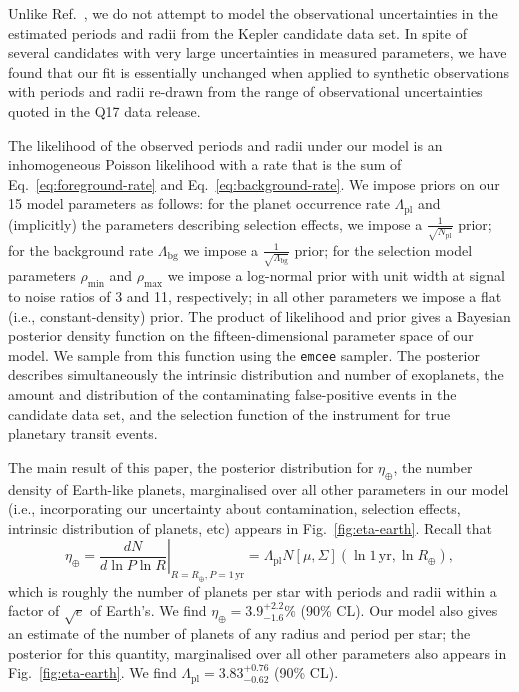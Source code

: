 \documentclass[12pt]{article}
\newcommand{\etaearth}{\eta_\oplus}
\newcommand{\REarth}{R_\oplus}
\newcommand{\Rpl}{\Lambda_\mathrm{pl}}
\newcommand{\Npl}{N_\mathrm{pl}}
\newcommand{\Rbg}{\Lambda_\mathrm{bg}}
\newcommand{\rhomin}{\rho_\mathrm{min}}
\newcommand{\rhomax}{\rho_\mathrm{max}}
\newcommand{\earange}{3.9_{-1.6}^{+2.2}\%}
\newcommand{\rplrange}{3.83_{-0.62}^{+0.76}}
\begin{document}
Unlike Ref.\ \cite{Foreman-Mackey2014}, we do not attempt to model the
observational uncertainties in the estimated periods and radii from
the Kepler candidate data set.  In spite of several candidates with
very large uncertainties in measured parameters, we have found that our
fit is essentially unchanged when applied to synthetic observations
with periods and radii re-drawn from the range of observational
uncertainties quoted in the Q17 data release.  

The likelihood of the observed periods and radii under our model is an
inhomogeneous Poisson likelihood\cite{Farr2013,Youdin2011} with a rate
that is the sum of Eq.\ \eqref{eq:foreground-rate} and
Eq.\ \eqref{eq:background-rate}.  We impose priors on our 15 model
parameters as follows: for the planet occurrence rate $\Rpl$ and
(implicitly) the parameters describing selection effects, we impose a
$\frac{1}{\sqrt{\Npl}}$ prior; for the background rate $\Rbg$ we
impose a $\frac{1}{\sqrt{\Rbg}}$ prior; for the selection model
parameters $\rhomin$ and $\rhomax$ we impose a log-normal prior with
unit width at signal to noise ratios of 3 and 11, respectively; in all
other parameters we impose a flat (i.e., constant-density) prior.  The
product of likelihood and prior gives a Bayesian posterior density
function on the fifteen-dimensional parameter space of our model.  We
sample from this function using the \texttt{emcee}
sampler\cite{Foreman-Mackey2013}.  The posterior describes
simultaneously the intrinsic distribution and number of exoplanets,
the amount and distribution of the contaminating false-positive events
in the candidate data set, and the selection function of the
instrument for true planetary transit events.

The main result of this paper, the posterior distribution for
$\etaearth$, the number density of Earth-like planets, marginalised
over all other parameters in our model (i.e., incorporating our
uncertainty about contamination, selection effects, intrinsic
distribution of planets, etc) appears in Fig.\ \ref{fig:eta-earth}.
Recall that
\begin{equation}
  \etaearth = \left. \frac{dN}{d \ln P \ln R} \right|_{R = \REarth, P
    = 1\,\mathrm{yr}} = \Rpl N\left[ \mu, \Sigma \right]\left( \ln 1\,\mathrm{yr},
  \ln \REarth \right),
\end{equation}
which is roughly the number of planets per star with periods and radii
within a factor of $\sqrt{e}$ of Earth's.  We find $\etaearth =
\earange$ (90\% CL).  Our model also gives an estimate of the number
of planets of any radius and period per star; the posterior for this
quantity, marginalised over all other parameters also appears in
Fig.\ \ref{fig:eta-earth}.  We find $\Rpl = \rplrange$ (90\% CL).
\end{document}
